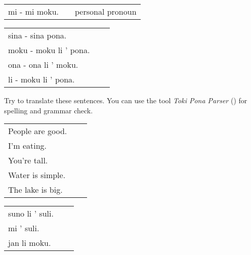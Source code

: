 \begin{supertabular}{p{5,5cm}|ll}
    mi - mi moku. &  & personal pronoun \\ %
\end{supertabular}

\begin{supertabular}{p{5,5cm}|ll}
    sina - sina pona.      &  & \\ %
    moku - moku li ' pona. &  & \\ %
    ona - ona li ' moku.   &  & \\ %
    li - moku li ' pona.   &  & \\ %
\end{supertabular}

Try to translate these sentences.
You can use the tool \textit{Toki Pona Parser} (\cite{www:rowa:02}) for spelling and grammar check.

\begin{supertabular}{p{5,5cm}|ll}
    People are good. &  & \\ %
    I'm eating.      &  & \\ %
    You're tall.     &  & \\ %
    Water is simple. &  & \\ %
    The lake is big. &  & \\ %
\end{supertabular}

\begin{supertabular}{p{5,5cm}|ll}
    suno li ' suli. &  & \\%
    mi ' suli.      &  & \\%
    jan li moku.    &  & \\%
\end{supertabular} \\%
%
